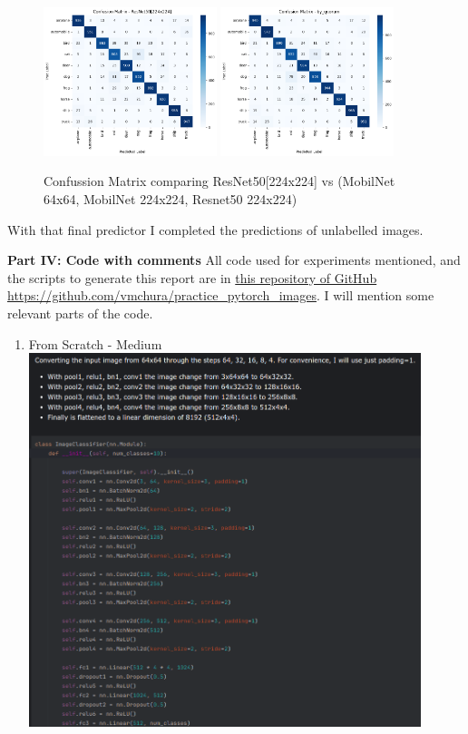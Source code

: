 \documentclass{cpsc202}
\begin{document}
    \begin{figure}[h]
        \caption{Confussion Matrix comparing ResNet50[224x224] vs (MobilNet 64x64, MobilNet 224x224, Resnet50 224x224)}
        \centering
        \includegraphics[width=0.45\textwidth]{confusion_matrix_resnet50}
        \includegraphics[width=0.45\textwidth]{confusion_matrix_by_quorum}
        \label{fig:confussion_matrix_quorum}
    \end{figure}

    With that final predictor I completed the predictions of unlabelled images.

    \large\textbf{Part IV: Code with comments}
    All code used for experiments mentioned, and the scripts to generate this report are in \href{https://github.com/vmchura/practice_pytorch_images}{this repository of GitHub https://github.com/vmchura/practice\_pytorch\_images}.
    I will mention some relevant parts of the code.
    \begin{enumerate}
        \item From Scratch - Medium \\
        \includegraphics[width=0.9\textwidth]{scratch_medium}
    \end{enumerate}
\end{document}
